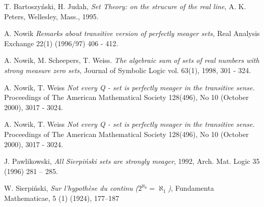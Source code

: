 \documentclass[b5cutpaper, twoside, 11pt, leqno]{moravica}
\newcommand{\bbbf}{{}} %
\theoremstyle{definition}
\begin{document}



\begin{thebibliography}{99}  %
\setlength{\itemsep}{6pt}
 T. Bartoszy\'nski, H. Judah, \textit{Set Theory: on the
strucure of the real line}, A. K. Peters, Wellesley, Mass., 1995.

 A. Nowik
\textit{Remarks about transitive version of perfectly
meager sets,} {\bbbf Real Analysis Exchange} 22(1) (1996/97) 406 - 412.

 A. Nowik, M. Scheepers, T. Weiss.
\textit{The algebraic sum of sets of
    real numbers with strong measure zero sets,}
{\bbbf Journal of Symbolic Logic} vol. 63(1), 1998, 301 - 324.

 A. Nowik, T. Weiss
\textit{Not every Q - set is perfectly meager in the transitive sense.}
{\bbbf Proceedings of The American Mathematical Society} 128(496), No 10
(October 2000), 3017 - 3024.

 A. Nowik, T. Weiss
\textit{Not every Q - set is perfectly meager in the transitive sense.}
{\bbbf Proceedings of The American Mathematical Society} 128(496), No 10
(October 2000), 3017 - 3024.

 J. Pawlikowski, \textit{All Sierpi\'nski sets are strongly
meager}, 1992, {\bbbf Arch. Mat. Logic} 35 (1996) 281 -- 285.

 W. Sierpi\'nski, \textit{Sur l'hypoth\`{e}se du continu 
($2^{\aleph_0} = \aleph_1$)}, {\bbbf Fundamenta Mathematicae}, 5 (1)
(1924), 177–187
\end{thebibliography}
\end{document}
